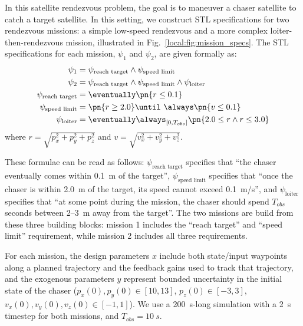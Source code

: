 In this satellite rendezvous problem, the goal is to maneuver a chaser satellite to catch a target satellite. In this setting, we construct STL specifications for two rendezvous missions: a simple low-speed rendezvous and a more complex loiter-then-rendezvous mission, illustrated in Fig.~\ref{local:fig:mission_specs}. The STL specifications for each mission, $\psi_1$ and $\psi_2$, are given formally as:
\begin{align*}
    \psi_1                   & = \psi_\text{reach target} \wedge \psi_\text{speed limit}                           \\
    \psi_2                   & = \psi_\text{reach target} \wedge \psi_\text{speed limit} \wedge \psi_\text{loiter} \\
    \psi_\text{reach target} & = \eventually \pn{r \leq 0.1}                                                       \\
    \psi_\text{speed limit}  & = \pn{r \geq 2.0} \until\ \always \pn{v \leq 0.1}                                   \\
    \psi_\text{loiter}       & = \eventually \always_{[0, T_{obs}]} \pn{2.0 \leq r \wedge r \leq 3.0}
\end{align*}
where $r = \sqrt{p_x^2 + p_y^2 + p_z^2}$ and $v = \sqrt{v_x^2 + v_y^2 + v_z^2}$.

These formulae can be read as follows: $\psi_\text{reach target}$ specifies that ``the chaser eventually comes within \SI{0.1}{m} of the target'', $\psi_\text{speed limit}$ specifies that ``once the chaser is within \SI{2.0}{m} of the target, its speed cannot exceed \SI{0.1}{m/s}'', and $\psi_\text{loiter}$ specifies that ``at some point during the mission, the chaser should spend $T_{obs}$ seconds between 2--\SI{3}{m} away from the target''. The two missions are build from these three building blocks: mission 1 includes the ``reach target'' and ``speed limit'' requirement, while mission 2 includes all three requirements.

For each mission, the design parameters $x$ include both state/input waypoints along a planned trajectory and the feedback gains used to track that trajectory, and the exogenous parameters $y$ represent bounded uncertainty in the initial state of the chaser ($p_x(0), p_y(0) \in [10, 13]$, $p_z(0) \in [-3, 3]$, $v_x(0), v_y(0), v_z(0) \in [-1, 1]$). We use a \SI{200}{s}-long simulation with a \SI{2}{s} timestep for both missions, and $T_{obs} = \SI{10}{s}$.

